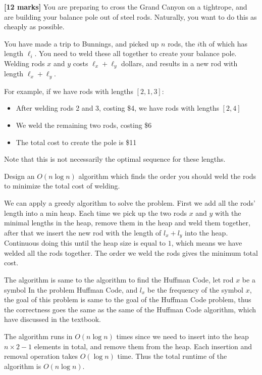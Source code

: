 \documentclass{article}
\begin{document}
\setcounter{question}{0}


\begin{Question}

\begin{Subquestion} \textbf{[12 marks]} 
You are preparing to cross the Grand Canyon on a tightrope, and are building your balance pole out of steel rods. Naturally, you want to do this as cheaply as possible.

You have made a trip to Bunnings, and picked up $n$ rods, the $i$th of which has length $\ell_i$. You need to weld these all together to create your balance pole. Welding rods $x$ and $y$ costs $\ell_x + \ell_y$ dollars, and results in a new rod with length $\ell_x + \ell_y$.

For example, if we have rods with lengths $[2, 1, 3]$:
\begin{itemize}
    \item After welding rods 2 and 3, costing \$4, we have rods with lengths $[2, 4]$
    \item We weld the remaining two rods, costing \$6
    \item The total cost to create the pole is \$11
\end{itemize}
Note that this is not necessarily the optimal sequence for these lengths.

Design an $O(n \log n)$ algorithm which finds the order you should weld the rods to minimize the total cost of welding.

\begin{answer}
We can apply a greedy algorithm to solve the problem. First we add all the rods'
length into a min heap. Each time we pick up the two rods $x$ and $y$ with the minimal lengths
 in the heap, remove them in the heap and weld them together, after that we insert 
the new rod with the length of $l_x + l_y$ into the heap. Continuous doing this until 
the heap size is equal to $1$, which means we have welded all the rods together. The order 
we weld the rods gives the minimum total cost.

The algorithm is same to the algorithm to find the Huffman Code, let rod $x$ be a symbol In
the problem Huffman Code, and $l_x$ be the frequency of the symbol $x$, the goal of this problem
is same to the goal of the Huffman Code problem, thus the correctness goes the same as the same of 
the Huffman Code algorithm, which have discussed in the textbook.

The algorithm runs in $O(n \log n)$ times since we need to insert into the heap $n\times 2-1$ elements in total,
and remove them from the heap. Each insertion and removal operation takes $O(\log n)$ time. Thus the 
total runtime of the algorithm is $O(n \log n)$.



\end{answer}
\end{Subquestion}
\end{Question}
\end{document}
